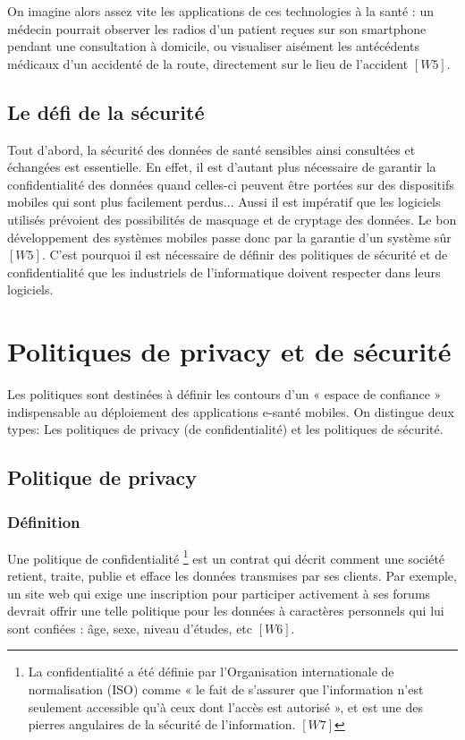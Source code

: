 \vspace{6pt}
\paragraphmark

On imagine alors assez vite les applications de ces technologies à la santé : un médecin pourrait observer les radios d’un patient reçues sur son smartphone pendant une consultation à domicile, ou visualiser aisément les antécédents médicaux d’un accidenté de la route, directement sur le lieu de l’accident $[W5]$.

\subsection{Le défi de la sécurité}

Tout d'abord, la sécurité des données de santé sensibles ainsi consultées et échangées est essentielle. En effet, il est d’autant plus nécessaire de garantir la confidentialité des données quand celles-ci peuvent être portées sur des dispositifs mobiles qui sont plus facilement perdus... Aussi il est impératif que les logiciels utilisés prévoient des possibilités de masquage et de cryptage des données.
Le bon développement des systèmes mobiles passe donc par la garantie d’un système sûr $[W5]$. C’est pourquoi il est nécessaire de définir des politiques de sécurité et de confidentialité que les industriels de l’informatique doivent respecter dans leurs logiciels.

\section{Politiques de privacy et de sécurité}

Les politiques sont destinées à définir les contours d’un « espace de confiance » indispensable au déploiement des applications e-santé mobiles. On distingue deux types: Les politiques de privacy (de confidentialité) et les politiques de sécurité.

\subsection{Politique de privacy}

\subsubsection{Définition}

Une politique de confidentialité \footnote{La confidentialité a été définie par l'Organisation internationale de normalisation (ISO) comme « le fait de s'assurer que l'information n'est seulement accessible qu'à ceux dont l'accès est autorisé », et est une des pierres angulaires de la sécurité de l'information. $[W7]$} est un contrat qui décrit comment une société retient, traite, publie et efface les données transmises par ses clients. Par exemple, un site web qui exige une inscription pour participer activement à ses forums devrait offrir une telle politique pour les données à caractères personnels qui lui sont confiées : âge, sexe, niveau d'études, etc $[W6]$.

